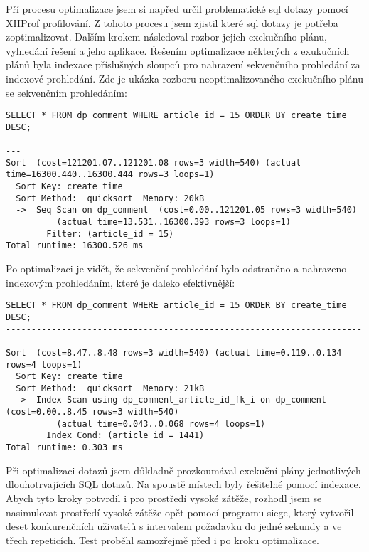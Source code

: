 \documentclass[12pt]{article}
\begin{document}
Pří procesu optimalizace jsem si napřed určil problematické sql dotazy pomocí XHProf profilování. Z tohoto procesu jsem zjistil které sql dotazy je potřeba zoptimalizovat. Dalším krokem následoval rozbor jejich exekučního plánu, vyhledání řešení a jeho aplikace. Řešením optimalizace některých z exukučních plánů byla indexace příslušných sloupců pro nahrazení sekvenčního prohledání za indexové prohledání. Zde je ukázka rozboru neoptimalizovaného exekučního plánu se sekvenčním prohledáním:

\begin{scriptsize}
\begin{verbatim}
SELECT * FROM dp_comment WHERE article_id = 15 ORDER BY create_time DESC;
-------------------------------------------------------------------------
Sort  (cost=121201.07..121201.08 rows=3 width=540) (actual time=16300.440..16300.444 rows=3 loops=1)
  Sort Key: create_time
  Sort Method:  quicksort  Memory: 20kB
  ->  Seq Scan on dp_comment  (cost=0.00..121201.05 rows=3 width=540) 
          (actual time=13.531..16300.393 rows=3 loops=1)
        Filter: (article_id = 15)
Total runtime: 16300.526 ms
\end{verbatim}
\end{scriptsize}

Po optimalizaci je vidět, že sekvenční prohledání bylo odstraněno a nahrazeno indexovým prohledáním, které je daleko efektivnější:

\begin{scriptsize}
\begin{verbatim}
SELECT * FROM dp_comment WHERE article_id = 15 ORDER BY create_time DESC;
-------------------------------------------------------------------------
Sort  (cost=8.47..8.48 rows=3 width=540) (actual time=0.119..0.134 rows=4 loops=1)
  Sort Key: create_time
  Sort Method:  quicksort  Memory: 21kB
  ->  Index Scan using dp_comment_article_id_fk_i on dp_comment  (cost=0.00..8.45 rows=3 width=540) 
          (actual time=0.043..0.068 rows=4 loops=1)
        Index Cond: (article_id = 1441)
Total runtime: 0.303 ms
\end{verbatim}
\end{scriptsize}

Při optimalizaci dotazů jsem důkladně prozkoumával exekuční plány jednotlivých dlouhotrvajících SQL dotazů. Na spoustě místech byly řešitelné pomocí indexace. Abych tyto kroky potvrdil i pro prostředí vysoké zátěže, rozhodl jsem se nasimulovat prostředí vysoké zátěže opět pomocí programu siege, který vytvořil deset konkurenčních uživatelů s intervalem požadavku do jedné sekundy a ve třech repeticích. Test proběhl samozřejmě před i po kroku optimalizace.
\end{document}
